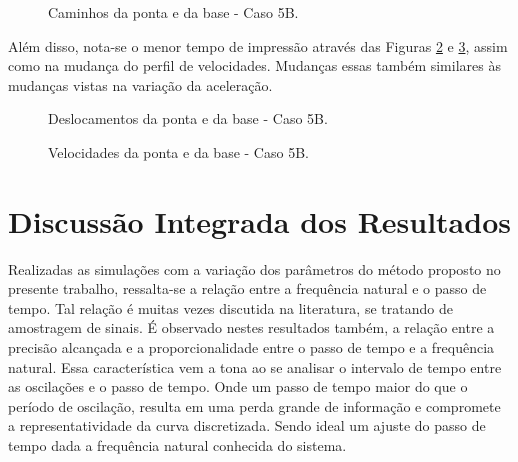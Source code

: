 \begin{figure}[H]
    \centering
    \hfill
    \hfill
    \hfill
    \caption{Caminhos da ponta e da base - Caso 5B.}
    \label{fig:5B_cam}
\end{figure}
Além disso, nota-se o menor tempo de impressão através das Figuras \ref{fig:5B_des} e \ref{fig:5B_vel}, assim como na mudança do perfil de velocidades. Mudanças essas também similares às mudanças vistas na variação da aceleração.

\begin{figure}[H]
    \centering
    \hfill
    \caption{Deslocamentos da ponta e da base - Caso 5B.}
    \label{fig:5B_des}
\end{figure}


\begin{figure}[H]
    \centering
    \hfill
    \caption{Velocidades da ponta e da base - Caso 5B.}
    \label{fig:5B_vel}
\end{figure}

\section{Discussão Integrada dos Resultados}
Realizadas as simulações com a variação dos parâmetros do método proposto no presente trabalho, ressalta-se a relação entre a frequência natural e o passo de tempo. Tal relação é muitas vezes discutida na literatura, se tratando de amostragem de sinais. É observado nestes resultados também, a relação entre a precisão alcançada e a proporcionalidade entre o passo de tempo e a frequência natural. Essa característica vem a tona ao se analisar o intervalo de tempo entre as oscilações e o passo de tempo. Onde um passo de tempo maior do que o período de oscilação, resulta em uma perda grande de informação e compromete a representatividade da curva discretizada. Sendo ideal um ajuste do passo de tempo dada a frequência natural conhecida do sistema.

